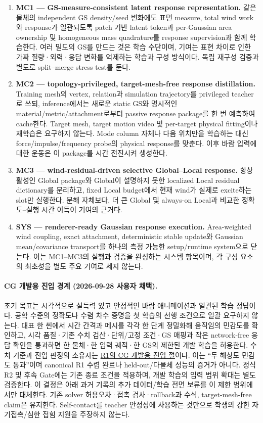 \documentclass[11pt]{article}
\begin{document}
\begin{enumerate}
  \item \textbf{MC1 --- GS-measure-consistent latent response representation.}
  같은 물체의 independent GS density/seed 변화에도 표면 measure, total wind work와 response가 일관되도록
  patch 기반 latent token과 per-Gaussian area ownership 및 homogeneous mass quadrature를 response supervision과 함께 학습한다.
  여러 밀도의 GS를 만드는 것은 학습 수단이며, 기여는 표현 차이로 인한 가짜 질량·외력·응답 변화를
  억제하는 학습과 구성 방식이다. 독립 재구성 검증과 별도로 split--merge stress test를 둔다.
  \item \textbf{MC2 --- topology-privileged, target-mesh-free response distillation.}
  Training mesh의 vertex, relation과 simulation trajectory를 privileged teacher로 쓰되,
  inference에서는 새로운 static GS와 명시적인 material/metric/attachment로부터 passive response package를
  한 번 예측하여 cache한다. Target mesh, target motion video 및 per-target physical fitting이나 재학습은 요구하지 않는다.
  Mode column 자체나 다음 위치만을 학습하는 대신 force/impulse/frequency probe의 physical response를 맞춘다.
  이후 바람 입력에 대한 운동은 이 package를 시간 전진시켜 생성한다.
  \item \textbf{MC3 --- wind-residual-driven selective Global--Local response.}
  항상 활성인 Global package와 Global이 설명하지 못한 localized Local residual dictionary를 분리하고,
  fixed Local budget에서 현재 wind가 실제로 excite하는 slot만 실행한다.
  분해 자체보다, 더 큰 Global 및 always-on Local과 비교한 정확도--실행 시간 이득이 기여의 근거다.
  \item \textbf{SYS --- renderer-ready Gaussian response execution.}
  Area-weighted wind coupling, exact attachment, deterministic stable update와 Gaussian mean/covariance transport를
  하나의 측정 가능한 setup/runtime system으로 닫는다. 이는 MC1--MC3의 실행과 검증을 완성하는
  시스템 항목이며, 각 구성 요소의 최초성을 별도 주요 기여로 세지 않는다.
\end{enumerate}

\paragraph{CG 개발용 진입 경계 (2026-09-28 사용자 채택).}
\label{sec:rd-cg-development-entry}
초기 목표는 시각적으로 설득력 있고 안정적인 바람 애니메이션과 일관된 학습 정답이다.
공학 수준의 정확도나 수렴 차수 증명을 첫 학습의 선행 조건으로 일괄 요구하지 않는다.
대표 한 씬에서 시간 간격과 메시를 각각 한 단계 정밀화해 움직임의 민감도를 확인하고,
시각 품질·기존 수치 검산·단위/고정 조건·GS 매핑과 작은 network-free 응답 확인을 통과하면
한 물체·한 입력 궤적·한 GS의 제한된 개발 학습을 허용한다.
수치 기준과 진입 판정의 소유자는 \href{development/r1_teacher_probe_oracle.pdf}{R1의 CG 개발용 진입 절}이다.
이는 ``두 해상도 민감도 통과''이며 canonical R1 수렴 완료나 held-out/다물체 성능의 증거가 아니다.
정식 R2 및 후속 Gate에는 기존 종료 조건을 적용하며, 개발 학습의 입력 범위 확대는 별도 검증한다.
이 결정은 아래 과거 기록의 추가 데이터/학습 전면 보류를 이 제한 범위에서만 대체한다.
기존 solver 허용오차·접촉 검사·rollback과 수식, target-mesh-free claim은 유지한다.
Self-contact를 teacher 안정성에 사용하는 것만으로 학생의 강한 자기접촉/심한 접힘 지원을 주장하지 않는다.
\end{document}
